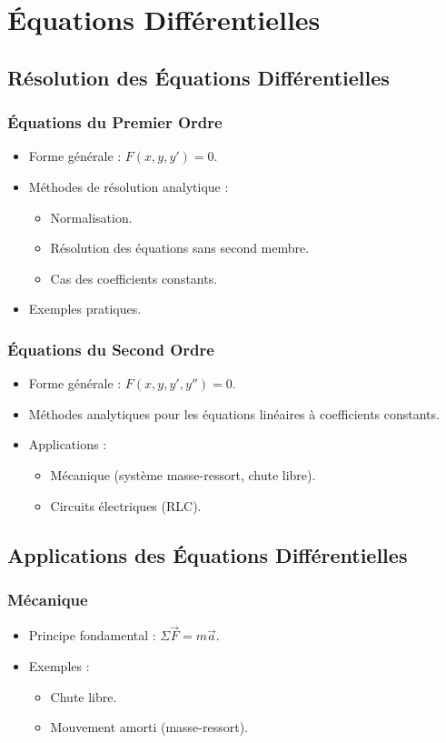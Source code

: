\chapter{Équations Différentielles}\label{df}
\section{Résolution des Équations Différentielles}
\subsection{Équations du Premier Ordre}
\begin{itemize}
    \item Forme générale : \( F(x, y, y') = 0 \).
    \item Méthodes de résolution analytique :
    \begin{itemize}
        \item Normalisation.
        \item Résolution des équations sans second membre.
        \item Cas des coefficients constants.
    \end{itemize}
    \item Exemples pratiques.
\end{itemize}

\subsection{Équations du Second Ordre}
\begin{itemize}
    \item Forme générale : \( F(x, y, y', y'') = 0 \).
    \item Méthodes analytiques pour les équations linéaires à coefficients constants.
    \item Applications :
    \begin{itemize}
        \item Mécanique (système masse-ressort, chute libre).
        \item Circuits électriques (RLC).
    \end{itemize}
\end{itemize}

\section{Applications des Équations Différentielles}
\subsection{Mécanique}
\begin{itemize}
    \item Principe fondamental : \(\Sigma \vec{F} = m\vec{a}\).
    \item Exemples :
    \begin{itemize}
        \item Chute libre.
        \item Mouvement amorti (masse-ressort).
    \end{itemize}
\end{itemize}

